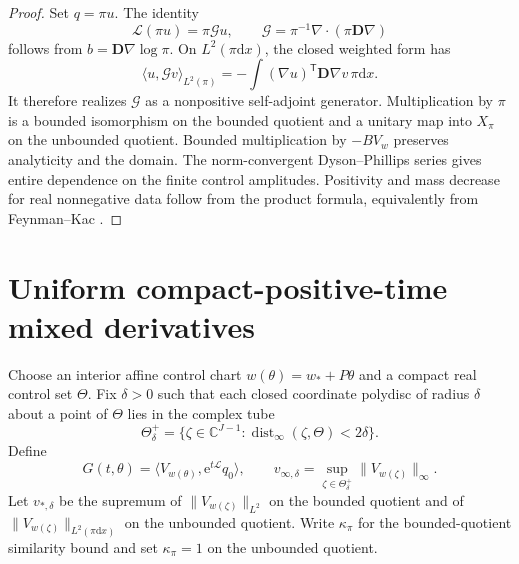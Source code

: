 \documentclass{iopjournal}
\newcommand{\dd}{\mathrm d}
\newcommand{\e}{\mathrm e}
\newcommand{\Lfree}{\mathcal L}
\theoremstyle{plain}
\theoremstyle{definition}
\begin{document}
\begin{proof}
Set \(q=\pi u\).  The identity
\begin{equation}
 \Lfree(\pi u)=\pi\mathcal Gu,\qquad
 \mathcal G=\pi^{-1}\nabla\!\cdot(\pi\bm D\nabla)
 \label{eq:supp-similarity}
\end{equation}
follows from \(b=\bm D\nabla\log\pi\).  On \(L^2(\pi\dd x)\), the closed
weighted form has
\begin{equation}
 \langle u,\mathcal Gv\rangle_{L^2(\pi)}
 =-\int(\nabla u)^{\mathsf T}\bm D\nabla v\,\pi\dd x.
 \label{eq:supp-form}
\end{equation}
It therefore realizes \(\mathcal G\) as a nonpositive self-adjoint generator.
Multiplication by \(\pi\) is a bounded isomorphism on the bounded quotient and
a unitary map into \(X_\pi\) on the unbounded quotient.  Bounded multiplication
by \(-BV_w\) preserves analyticity and the domain.  The norm-convergent
Dyson--Phillips series gives entire dependence on the finite control
amplitudes.  Positivity and mass decrease for real nonnegative data follow
from the product formula, equivalently from Feynman--Kac
\cite{bressloff2022feynmanKac,grebenkov2020multiple}.
\end{proof}

\section{Uniform compact-positive-time mixed derivatives}
\label{app:mixed-jet}

Choose an interior affine control chart \(w(\theta)=w_*+P\theta\) and a
compact real control set \(\Theta\).  Fix \(\delta>0\) such that each closed
coordinate polydisc of radius \(\delta\) about a point of \(\Theta\) lies in
the complex tube
\begin{equation}
 \Theta_\delta^+
 =\{\zeta\in\mathbb C^{J-1}:
   \operatorname{dist}_\infty(\zeta,\Theta)<2\delta\}.
 \label{eq:supp-tube}
\end{equation}
Define
\begin{equation}
 G(t,\theta)=\langle V_{w(\theta)},\e^{t\Lfree}q_0\rangle,\qquad
 v_{\infty,\delta}=
 \sup_{\zeta\in\Theta_\delta^+}\|V_{w(\zeta)}\|_\infty .
 \label{eq:supp-free-exposure}
\end{equation}
Let \(v_{*,\delta}\) be the supremum of
\(\|V_{w(\zeta)}\|_{L^2}\) on the bounded quotient and of
\(\|V_{w(\zeta)}\|_{L^2(\pi\dd x)}\) on the unbounded quotient.  Write
\(\kappa_\pi\) for the bounded-quotient similarity bound and set
\(\kappa_\pi=1\) on the unbounded quotient.
\end{document}
